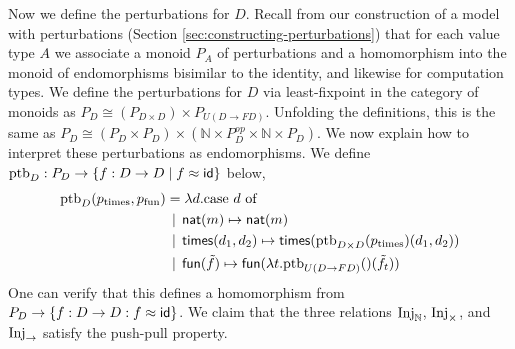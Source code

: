 Now we define the perturbations for $D$.
Recall from our construction of a model with perturbations
(Section \ref{sec:constructing-perturbations}) that for each value
type $A$ we associate a monoid $P_A$ of perturbations
and a homomorphism into the monoid of endomorphisms bisimilar to the identity,
and likewise for computation types.
We define the perturbations for $D$ via least-fixpoint in the category of monoids as
%
\( P_D \cong (P_{D \times D}) \times P_{U(D \to FD)}. \)
%
Unfolding the definitions, this is the same as
%
\( P_D \cong (P_D \times P_D) \times (\mathbb{N} \times P_D^{op} \times \mathbb{N} \times P_D). \)
%
We now explain how to interpret these perturbations as endomorphisms.
We define $\text{ptb}_D : P_D \to \{ f : D \to D \mid f \approx \mathsf{id} \}$ below,
%
%
\begin{align*}
 \text{ptb}_D(p_{\text{times}}, p_{\text{fun}}) &= \lambda d.\text{case $d$ of}  \\
 &\mathrel{\bf \,\mid\,} \mathsf{nat}(m) \mapsto \mathsf{nat}(m) \\
    &\mathrel{\bf \,\mid\,} \mathsf{times}(d_1, d_2) \mapsto {\mathsf{times}(\text{ptb}_{D \times D}(p_\text{times})(d_1, d_2))} \\
    &\mathrel{\bf \,\mid\,} \mathsf{fun}(\tilde{f}) \mapsto {\mathsf{fun}(\lambda t. \text{ptb}_{U(D \to FD)}()(\tilde{f}_t))} \\
\end{align*}
One can verify that this defines a homomorphism from $P_D \to \{ f : D \to D : f \approx \mathsf{id} \}$.
We claim that the three relations $\text{Inj}_\mathbb{N}$, $\text{Inj}_\times$, and $\text{Inj}_\to$
satisfy the push-pull property.
